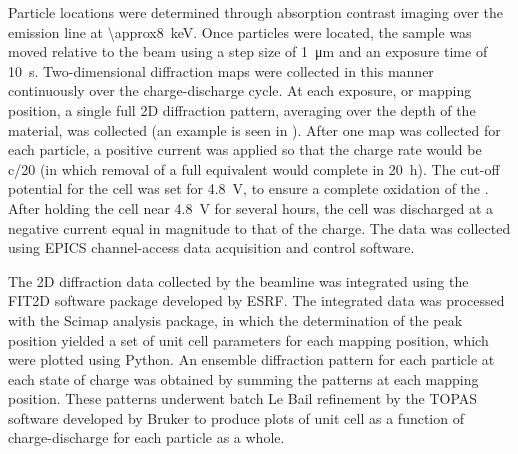 \documentclass{article}
\begin{document}
Particle locations were determined through absorption contrast imaging
over the  emission line at
\SI{\approx8}{\kilo\electronvolt}. Once particles were located, the
sample was moved relative to the beam using a step size of
\SI{1}{\micro\meter} and an exposure time of
\SI{10}{\second}. Two-dimensional diffraction maps were collected in
this manner continuously over the charge-discharge cycle. At each
exposure, or mapping position, a single full 2D diffraction pattern,
averaging over the depth of the material, was collected (an example is
seen in ). After one map was collected for
each particle, a positive current was applied so that the charge rate
would be c/20 (in which removal of a full  equivalent would
complete in \SI{20}{\hour}). The cut-off potential for the cell was
set for \SI{4.8}{\volt}, to ensure a complete oxidation of the
\nca{}. After holding the cell near \SI{4.8}{\volt} for several hours,
the cell was discharged at a negative current equal in magnitude to
that of the charge. The data was collected using EPICS channel-access
data acquisition and control software.

The 2D diffraction data collected by the beamline was integrated using
the FIT2D software package developed by
ESRF\cite{hausermann1996,hammersley1997}. The integrated data was
processed with the Scimap analysis package\cite{scimap}, in which the
determination of the peak position yielded a set of unit cell
parameters for each mapping position, which were plotted using
Python. An ensemble diffraction pattern for each particle at each
state of charge was obtained by summing the patterns at each mapping
position. These patterns underwent batch Le Bail refinement by the
TOPAS software developed by Bruker to produce plots of unit cell as a
function of charge-discharge for each particle as a whole.
\end{document}
